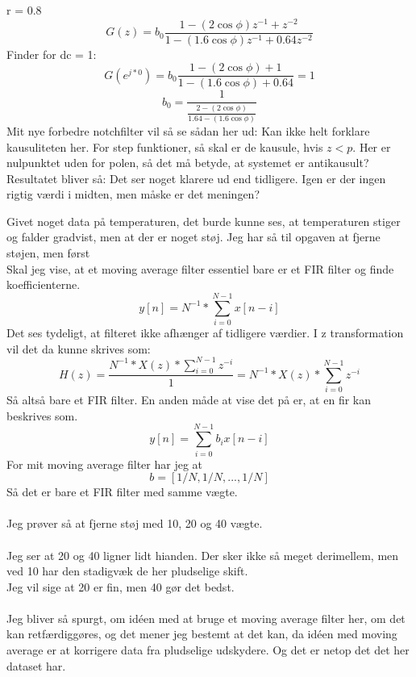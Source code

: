 \begin{Øvelser}
\begin{kapitel}
\begin{Øvelse}
            r = 0.8 
            \[G(z)=b_0 \frac{1-(2\cos\phi)z^{-1}+z^{-2}}{1-(1.6\cos\phi)z^{-1}+0.64z^{-2}}\]
            Finder for dc = 1: 
            \[G(e^{j*0})=b_0 \frac{1-(2\cos\phi)+1}{1-(1.6\cos\phi)+0.64} = 1\]
            \[b_0 = \frac{1}{\frac{2-(2\cos\phi)}{1.64-(1.6\cos\phi)}}\]
            Mit nye forbedre notchfilter vil så se sådan her ud: 
            \clearpage
            Kan ikke helt forklare kausuliteten her. For step funktioner, så skal er de kausule, hvis $z < p$. Her er nulpunktet uden for polen, så det må betyde, at systemet er antikausult?
            Resultatet bliver så: 
            Det ser noget klarere ud end tidligere. Igen er der ingen rigtig værdi i midten, men måske er det meningen? 
            

        \end{Øvelse}
        \clearpage
        \begin{Øvelse}
            Givet noget data på temperaturen, det burde kunne ses, at temperaturen stiger og falder gradvist, men at der er noget støj. 
            Jeg har så til opgaven at fjerne støjen, men først \\
            Skal jeg vise, at et moving average filter essentiel bare er et FIR filter og finde koefficienterne.\\
            
            \[y[n] = N^{-1} * \sum_{i = 0}^{N - 1} x[n - i]\]
            Det ses tydeligt, at filteret ikke afhænger af tidligere værdier. I z transformation vil det da kunne skrives som: 
            \[H(z) = \frac{N^{-1} * X(z) * \sum_{i = 0}^{N - 1} z^{-i}}{1} = N^{-1} * X(z) * \sum_{i = 0}^{N - 1} z^{-i}\]
            Så altså bare et FIR filter. 
            En anden måde at vise det på er, at en fir kan beskrives som. 
            \[y[n] = \sum_{i = 0}^{N - 1}b_i x[n - i]\]
            For mit moving average filter har jeg at
            \[b = [1/N, 1/N, ..., 1/N]\]
            Så det er bare et FIR filter med samme vægte.\\\\
            Jeg prøver så at fjerne støj med 10, 20 og 40 vægte.
            \\\\
            Jeg ser at 20 og 40 ligner lidt hianden. Der sker ikke så meget derimellem, men ved 10 har den stadigvæk de her pludselige skift.\\
            Jeg vil sige at 20 er fin, men 40  gør det bedst. \\\\
            Jeg bliver så spurgt, om idéen med at bruge et moving average filter her, om det kan retfærdiggøres, og det mener jeg bestemt at det kan, da idéen med moving average er at korrigere data fra pludselige udskydere.
            Og det er netop det det her dataset har. \\\\


\end{Øvelse}
\end{kapitel}
\end{Øvelser}
